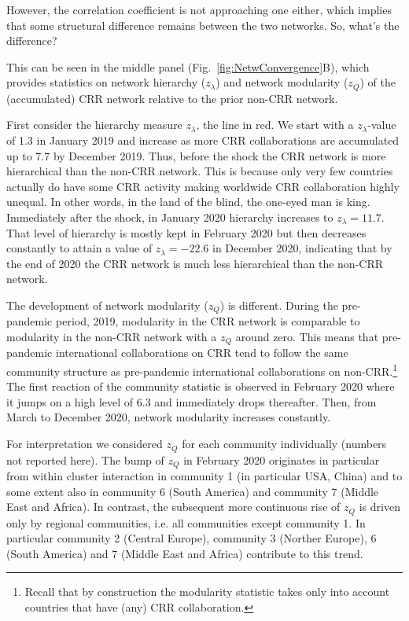 However, the correlation coefficient is not approaching one either, which implies that some structural difference remains between the two networks. So, what's the difference? 

This can be seen in the middle panel (Fig.~\ref{fig:NetwConvergence}B), which provides statistics on network hierarchy ($z_\lambda$) and network modularity ($z_Q$) of the (accumulated) CRR network relative to the prior non-CRR network.

First consider the hierarchy measure $z_\lambda$, the line in red. We start with a $z_\lambda$-value of 1.3 in January 2019 and increase as more CRR collaborations are accumulated up to 7.7 by December 2019. Thus, before the shock the CRR network is more hierarchical than the non-CRR network. This is because only very few countries actually do have some CRR activity making worldwide CRR collaboration highly unequal. In other words, in the land of the blind, the one-eyed man is king. Immediately after the shock, in January 2020 hierarchy increases to $z_\lambda=11.7$. That level of hierarchy is mostly kept in February 2020 but then decreases constantly to attain a value of $z_\lambda=-22.6$ in December 2020, indicating that by the end of 2020 the CRR network is much less hierarchical than the non-CRR network. 

The development of network modularity ($z_Q$) is different. During the pre-pandemic period, 2019, modularity in the CRR network is comparable to modularity in the non-CRR network with a $z_Q$ around zero. This means that pre-pandemic international collaborations on CRR tend to follow the same community structure as pre-pandemic international collaborations on non-CRR.\footnote{Recall that by construction the modularity statistic takes only into account countries that have (any) CRR collaboration.} The first reaction of the community statistic is observed in February 2020 where it jumps on a high level of 6.3 and immediately drops thereafter. Then, from March to December 2020, network modularity increases constantly.

For interpretation we considered $z_Q$ for each community individually (numbers not reported here). The bump of $z_Q$ in February 2020 originates in particular from within cluster interaction in community 1 (in particular USA, China) and to some extent also in community 6 (South America) and community 7 (Middle East and Africa). In contrast, the subsequent more continuous rise of $z_Q$ is driven only by regional communities, i.e. all communities except community 1. In particular community 2 (Central Europe), community 3 (Norther Europe), 6 (South America) and 7 (Middle East and Africa) contribute to this trend.

